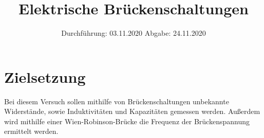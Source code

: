

\subject{V302}
\title{Elektrische Brückenschaltungen}
\date{
    Durchführung: 03.11.2020
    \hspace{3em}
    Abgabe: 24.11.2020
}



\maketitle
\thispagestyle{empty}
\tableofcontents
\newpage

\section{Zielsetzung} \label{sec:Ziel}

Bei diesem Versuch sollen mithilfe von Brückenschaltungen unbekannte Widerstände, sowie Induktivitäten und Kapazitäten gemessen werden.
Außerdem wird mithilfe einer Wien-Robinson-Brücke die Frequenz der Brückenspannung ermittelt werden.


\newpage


\newpage


\newpage


